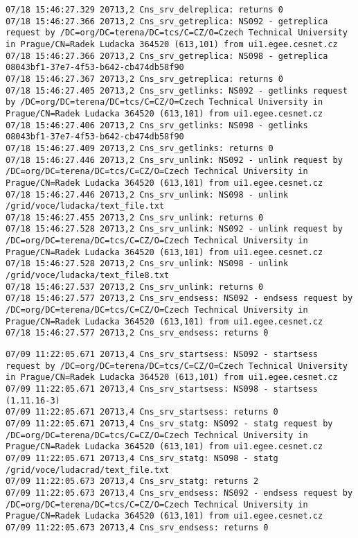 \documentclass[a4paper, 11pt]{article} %
\begin{document}
\begin{lstlisting}
07/18 15:46:27.329 20713,2 Cns_srv_delreplica: returns 0
07/18 15:46:27.366 20713,2 Cns_srv_getreplica: NS092 - getreplica request by /DC=org/DC=terena/DC=tcs/C=CZ/O=Czech Technical University in Prague/CN=Radek Ludacka 364520 (613,101) from ui1.egee.cesnet.cz
07/18 15:46:27.366 20713,2 Cns_srv_getreplica: NS098 - getreplica  08043bf1-37e7-4f53-b642-cb474db58f90
07/18 15:46:27.367 20713,2 Cns_srv_getreplica: returns 0
07/18 15:46:27.405 20713,2 Cns_srv_getlinks: NS092 - getlinks request by /DC=org/DC=terena/DC=tcs/C=CZ/O=Czech Technical University in Prague/CN=Radek Ludacka 364520 (613,101) from ui1.egee.cesnet.cz
07/18 15:46:27.406 20713,2 Cns_srv_getlinks: NS098 - getlinks  08043bf1-37e7-4f53-b642-cb474db58f90
07/18 15:46:27.409 20713,2 Cns_srv_getlinks: returns 0
07/18 15:46:27.446 20713,2 Cns_srv_unlink: NS092 - unlink request by /DC=org/DC=terena/DC=tcs/C=CZ/O=Czech Technical University in Prague/CN=Radek Ludacka 364520 (613,101) from ui1.egee.cesnet.cz
07/18 15:46:27.446 20713,2 Cns_srv_unlink: NS098 - unlink /grid/voce/ludacka/text_file.txt
07/18 15:46:27.455 20713,2 Cns_srv_unlink: returns 0
07/18 15:46:27.528 20713,2 Cns_srv_unlink: NS092 - unlink request by /DC=org/DC=terena/DC=tcs/C=CZ/O=Czech Technical University in Prague/CN=Radek Ludacka 364520 (613,101) from ui1.egee.cesnet.cz
07/18 15:46:27.528 20713,2 Cns_srv_unlink: NS098 - unlink /grid/voce/ludacka/text_file8.txt
07/18 15:46:27.537 20713,2 Cns_srv_unlink: returns 0
07/18 15:46:27.577 20713,2 Cns_srv_endsess: NS092 - endsess request by /DC=org/DC=terena/DC=tcs/C=CZ/O=Czech Technical University in Prague/CN=Radek Ludacka 364520 (613,101) from ui1.egee.cesnet.cz
07/18 15:46:27.577 20713,2 Cns_srv_endsess: returns 0
\end{lstlisting}

\begin{lstlisting}[label={log:del5},caption={lcg-del -a lfn:/grid/voce/ludacrad/text\_file.txt - try to delete file that does not exist}]
07/09 11:22:05.671 20713,4 Cns_srv_startsess: NS092 - startsess request by /DC=org/DC=terena/DC=tcs/C=CZ/O=Czech Technical University in Prague/CN=Radek Ludacka 364520 (613,101) from ui1.egee.cesnet.cz
07/09 11:22:05.671 20713,4 Cns_srv_startsess: NS098 - startsess (1.11.16-3)
07/09 11:22:05.671 20713,4 Cns_srv_startsess: returns 0
07/09 11:22:05.671 20713,4 Cns_srv_statg: NS092 - statg request by /DC=org/DC=terena/DC=tcs/C=CZ/O=Czech Technical University in Prague/CN=Radek Ludacka 364520 (613,101) from ui1.egee.cesnet.cz
07/09 11:22:05.671 20713,4 Cns_srv_statg: NS098 - statg /grid/voce/ludacrad/text_file.txt
07/09 11:22:05.673 20713,4 Cns_srv_statg: returns 2
07/09 11:22:05.673 20713,4 Cns_srv_endsess: NS092 - endsess request by /DC=org/DC=terena/DC=tcs/C=CZ/O=Czech Technical University in Prague/CN=Radek Ludacka 364520 (613,101) from ui1.egee.cesnet.cz
07/09 11:22:05.673 20713,4 Cns_srv_endsess: returns 0
\end{lstlisting}
\end{document}
